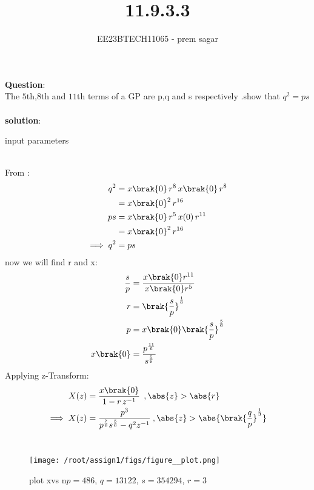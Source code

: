\documentclass[journal,12pt,twocolumn]{IEEEtran}
\theoremstyle{remark}
\begin{document}

\vspace{3cm}

\title{11.9.3.3}
\author{EE23BTECH11065 - prem sagar}
\maketitle
\newpage

\bigskip 

\renewcommand{\thefigure}{\theenumi}
\renewcommand{\thetable}{\theenumi}
\textbf{Question}:\\ The $5$th,$8$th and $11$th terms of a GP are p,q and s respectively .show that $q^2=ps$
\\\\\textbf{solution}:
\fi
\begin{table}[!ht]
   \centering
    \renewcommand\thetable{1}
      
    \caption{input parameters}
    \label{tab:11.9.3}
 \end{table}
\\ From :
\begin{align}
q^2&=x\brak{0}\,r^8\,x\brak{0}\,r^8
     \\ &=x\brak{0}^2\,r^{16}
\\ps&=x\brak{0}\,r^5\,x(0)\,r^{11}
       \\&=x\brak{0}^2\,r^{16}
\\\implies q^2&=ps
\end{align}
now we will find r and x:
\begin{align}
\frac{s}{p}&=\frac{x\brak{0}r^{11}}{x\brak{0}r^5}
\\r&=\brak{\frac{s}{p}}^\frac{1}{6} 
\\p&=x\brak{0}\brak{\frac{s}{p}}^\frac{5}{6}
\\x\brak{0}&=\frac{p^\frac{11}{6}}{s^\frac{5}{6}}
\end{align}
Applying z-Transform:
\begin{align}
     X(z) &= \frac{x\brak{0}}{1-r\,z^{-1}}\: \:,\abs{z}>\abs{r}
\\ \implies  X(z)&=\frac{p^3}{p^\frac{7}{6}s^\frac{5}{6}-q^2z^{-1}}\:,\abs{z}>\abs{\brak{\frac{q}{p}}^\frac{1}{3}}
     \end{align}    
\\\begin{figure}[h]
   \renewcommand\thefigure{1}
    \centering
    \texttt{[image: /root/assign1/figs/figure\_\_plot.png]}
    \caption{plot xvs n\hspace{0.1cm}$p=486$,
    \hspace{0.1cm}$q=13122$,
    \hspace{0.1cm}$s=354294$,
    \hspace{0.1cm}$r=3$}
    \label{fig:1}
\end{figure}\\
\end{document}
